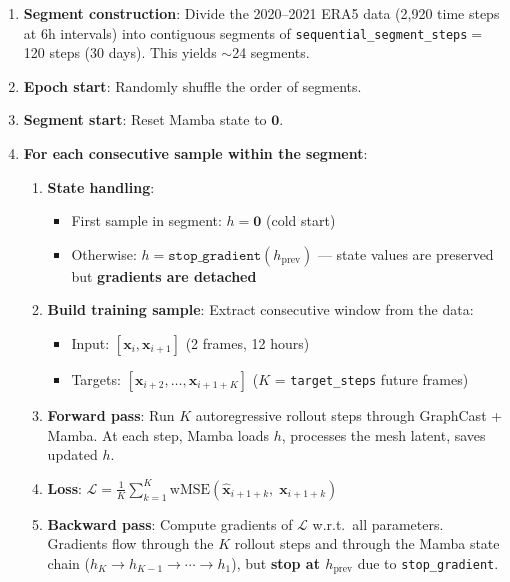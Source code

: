 \documentclass[11pt,a4paper]{article}
\begin{document}
\begin{enumerate}
  \item \textbf{Segment construction}: Divide the 2020--2021 ERA5 data (2,920 time steps at 6h intervals) into contiguous segments of \texttt{sequential\_segment\_steps}$=$120 steps (30 days). This yields $\sim$24 segments.

  \item \textbf{Epoch start}: Randomly shuffle the order of segments.

  \item \textbf{Segment start}: Reset Mamba state to $\mathbf{0}$.

  \item \textbf{For each consecutive sample within the segment}:
  \begin{enumerate}
    \item \textbf{State handling}:
    \begin{itemize}[nosep]
      \item First sample in segment: $h = \mathbf{0}$ (cold start)
      \item Otherwise: $h = \texttt{stop\_gradient}(h_\text{prev})$ --- state values are preserved but \textbf{gradients are detached}
    \end{itemize}

    \item \textbf{Build training sample}: Extract consecutive window from the data:
    \begin{itemize}[nosep]
      \item Input: $[\mathbf{x}_i, \mathbf{x}_{i+1}]$ (2 frames, 12 hours)
      \item Targets: $[\mathbf{x}_{i+2}, \ldots, \mathbf{x}_{i+1+K}]$ ($K$ = \texttt{target\_steps} future frames)
    \end{itemize}

    \item \textbf{Forward pass}: Run $K$ autoregressive rollout steps through GraphCast + Mamba. At each step, Mamba loads $h$, processes the mesh latent, saves updated $h$.

    \item \textbf{Loss}: $\mathcal{L} = \frac{1}{K}\sum_{k=1}^{K} \text{wMSE}(\hat{\mathbf{x}}_{i+1+k},\; \mathbf{x}_{i+1+k})$

    \item \textbf{Backward pass}: Compute gradients of $\mathcal{L}$ w.r.t.\ all parameters. Gradients flow through the $K$ rollout steps and through the Mamba state chain ($h_K \to h_{K-1} \to \cdots \to h_1$), but \textbf{stop at $h_\text{prev}$} due to \texttt{stop\_gradient}.


\end{enumerate}
\end{enumerate}
\end{document}
